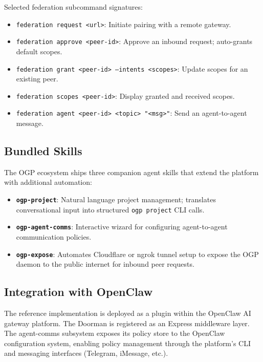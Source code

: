\documentclass[conference]{IEEEtran}
\begin{document}
Selected federation subcommand signatures:

\begin{itemize}
  \item \texttt{federation request <url>}: Initiate pairing with a remote gateway.
  \item \texttt{federation approve <peer-id>}: Approve an inbound request; auto-grants default scopes.
  \item \texttt{federation grant <peer-id> --intents <scopes>}: Update scopes for an existing peer.
  \item \texttt{federation scopes <peer-id>}: Display granted and received scopes.
  \item \texttt{federation agent <peer-id> <topic> "<msg>"}: Send an agent-to-agent message.
\end{itemize}

\subsection{Bundled Skills}

The OGP ecosystem ships three companion agent skills that extend the platform with additional automation:

\begin{itemize}
  \item \textbf{\texttt{ogp-project}}: Natural language project management; translates conversational input into structured \texttt{ogp project} CLI calls.
  \item \textbf{\texttt{ogp-agent-comms}}: Interactive wizard for configuring agent-to-agent communication policies.
  \item \textbf{\texttt{ogp-expose}}: Automates Cloudflare or ngrok tunnel setup to expose the OGP daemon to the public internet for inbound peer requests.
\end{itemize}

\subsection{Integration with OpenClaw}

The reference implementation is deployed as a plugin within the OpenClaw AI gateway platform. The Doorman is registered as an Express middleware layer. The agent-comms subsystem exposes its policy store to the OpenClaw configuration system, enabling policy management through the platform's CLI and messaging interfaces (Telegram, iMessage, etc.).
\end{document}
